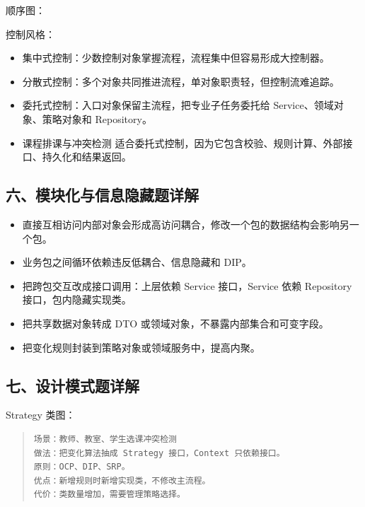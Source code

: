 \documentclass[UTF8,zihao=-4]{ctexart}
\begin{document}
顺序图：





控制风格：


\begin{itemize}
\item 集中式控制：少数控制对象掌握流程，流程集中但容易形成大控制器。
\item 分散式控制：多个对象共同推进流程，单对象职责轻，但控制流难追踪。
\item 委托式控制：入口对象保留主流程，把专业子任务委托给 Service、领域对象、策略对象和 Repository。
\item 课程排课与冲突检测 适合委托式控制，因为它包含校验、规则计算、外部接口、持久化和结果返回。
\end{itemize}



\subsection{六、模块化与信息隐藏题详解}


\begin{itemize}
\item 直接互相访问内部对象会形成高访问耦合，修改一个包的数据结构会影响另一个包。
\item 业务包之间循环依赖违反低耦合、信息隐藏和 DIP。
\item 把跨包交互改成接口调用：上层依赖 Service 接口，Service 依赖 Repository 接口，包内隐藏实现类。
\item 把共享数据对象转成 DTO 或领域对象，不暴露内部集合和可变字段。
\item 把变化规则封装到策略对象或领域服务中，提高内聚。
\end{itemize}



\subsection{七、设计模式题详解}


Strategy 类图：


\begin{quote}
\footnotesize
\begin{verbatim}
场景：教师、教室、学生选课冲突检测
做法：把变化算法抽成 Strategy 接口，Context 只依赖接口。
原则：OCP、DIP、SRP。
优点：新增规则时新增实现类，不修改主流程。
代价：类数量增加，需要管理策略选择。
\end{verbatim}
\end{quote}
\end{document}

